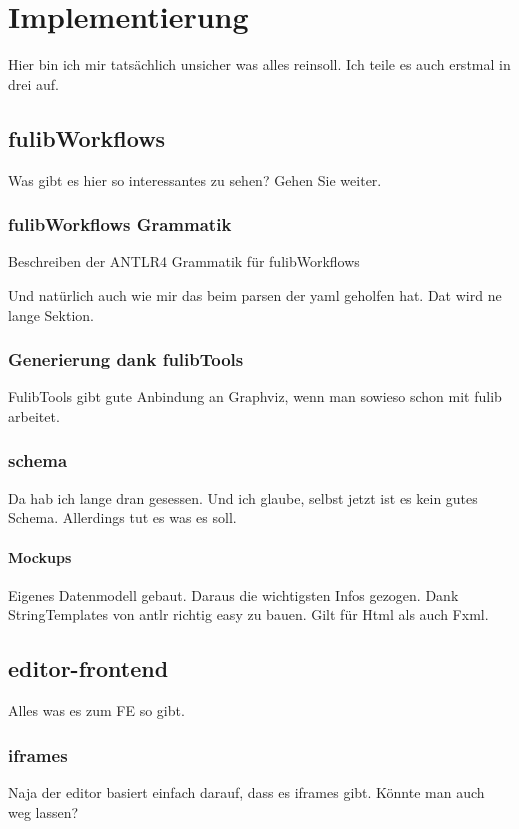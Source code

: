 \chapter{Implementierung}\label{ch:implementierung}
\todo
Hier bin ich mir tatsächlich unsicher was alles reinsoll.
Ich teile es auch erstmal in drei auf.

\section{fulibWorkflows}\label{sec:fulibworkflows2}
\todo
Was gibt es hier so interessantes zu sehen?
Gehen Sie weiter.

\subsection{fulibWorkflows Grammatik}\label{subsec:fulibworkflows-grammatik}
\todo
Beschreiben der ANTLR4 Grammatik für fulibWorkflows

Und natürlich auch wie mir das beim parsen der yaml geholfen hat.
Dat wird ne lange Sektion.

\subsection{Generierung dank fulibTools}\label{subsec:generierung-dank-fulibtools}
\todo
FulibTools gibt gute Anbindung an Graphviz, wenn man sowieso schon mit fulib arbeitet.

\subsection{schema}\label{subsec:schema}
\todo
Da hab ich lange dran gesessen.
Und ich glaube, selbst jetzt ist es kein gutes Schema.
Allerdings tut es was es soll.

\subsubsection{Mockups}
\todo
Eigenes Datenmodell gebaut.
Daraus die wichtigsten Infos gezogen.
Dank StringTemplates von antlr richtig easy zu bauen.
Gilt für Html als auch Fxml.

\section{editor-frontend}\label{sec:editor-frontend}
\todo
Alles was es zum FE so gibt.

\subsection{iframes}\label{subsec:iframes}
\todo
Naja der editor basiert einfach darauf, dass es iframes gibt.
Könnte man auch weg lassen?

